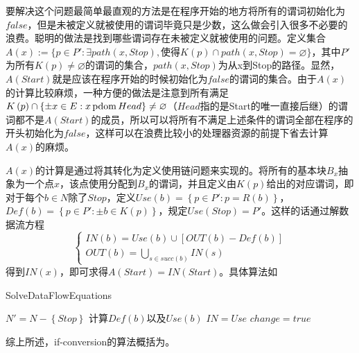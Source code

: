 要解决这个问题最简单最直观的方法是在程序开始的地方将所有的谓词初始化为$false$，但是未被定义就被使用的谓词毕竟只是少数，这么做会引入很多不必要的浪费。聪明的做法是找到哪些谓词存在未被定义就被使用的问题。定义集合$A\left(x\right):=\{p\in P': \exists path\left(x,Stop\right), \text{使得}K\left(p\right)\cap path\left(x,Stop\right)=\varnothing\}$，其中$P'$为所有$K\left(p\right)\neq\varnothing$的谓词的集合，$path\left(x,Stop\right)$为从x到Stop的路径。显然，$A\left(Start\right)$就是应该在程序开始的时候初始化为$false$的谓词的集合。由于$A\left(x\right)$的计算比较麻烦，一种方便的做法是注意到所有满足$K\left(p\right)\cap\left\{\pm x\in E:x \,\mathrm{pdom}\, Head\right\}\neq\varnothing$（$Head$指的是Start的唯一直接后继）的谓词都不是$A\left(Start\right)$的成员，所以可以将所有不满足上述条件的谓词全部在程序的开头初始化为$false$，这样可以在浪费比较小的处理器资源的前提下省去计算$A\left(x\right)$的麻烦。

$A\left(x\right)$的计算是通过将其转化为定义使用链问题来实现的。将所有的基本块$B_x$抽象为一个点$x$，该点使用分配到$B_x$的谓词，并且定义由$K\left(p\right)$给出的对应谓词，即对于每个$b\in N$除了$Stop$，定义$Use\left(b\right)=\left\{p\in P':p=R\left(b\right)\right\}$，$Def\left(b\right)=\left\{p\in P':\pm b \in K\left(p\right)\right\}$，规定$Use\left(Stop\right)=P'$。这样的话通过解数据流方程
\[
\left\{ \begin{array}{l}
IN\left(b\right)=Use\left(b\right)\cup\left[OUT\left(b\right)-Def\left(b\right)\right]\\
OUT\left(b\right)=\underset{s\in succ\left(b\right)}{\bigcup}IN\left(s\right)
\end{array}\right.
\]
得到$IN\left(x\right)$，即可求得$A\left(Start\right)=IN\left(Start\right)$。具体算法如

\begin{algorithm}[H]
	\label{alg:du}
	\caption{SolveDataFlowEquations}
	$N'=N-\left\{Stop\right\}$\;
	计算$Def\left(b\right)$以及$Use\left(b\right)$\;
	$IN=Use$\;
	$change=true$\;
\end{algorithm}

综上所述，if-conversion的算法概括为。

